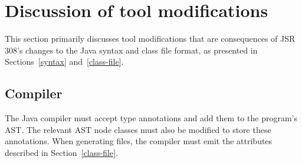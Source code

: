 \documentclass[10pt]{article}
\begin{document}
% 
% 
% 
% 
% 
% 
% 
% 
% 


\section{Discussion of tool modifications\label{mods-discussion}}

This section primarily discusses tool modifications that are consequences
of JSR 308's changes to the Java syntax and class file format, as presented
in Sections~\ref{syntax} and~\ref{class-file}.


\subsection{Compiler\label{compiler-mods}}

The Java compiler must accept type annotations
and add them to the program's AST\@.  The relevant AST node
classes must also be modified to store these annotations.
When generating  files, the compiler must emit the attributes
described in Section~\ref{class-file}.
\end{document}
